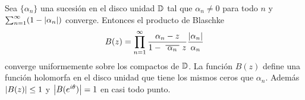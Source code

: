 
\begin{theorem}
    Sea $\{\alpha_n\}$ una sucesión en el disco unidad $\mathbb{D}$ tal que $\alpha_n \not = 0$ para todo $n$ y $\sum_{n=1}^{\infty} (1 - \left\lvert\alpha_n\right\rvert)$ converge. Entonces el producto de Blaschke
    \begin{equation*}
        B(z) = \prod_{n=1}^{\infty} \frac{\alpha_n - z}{1 - \xbar{\alpha_n}z} \dfrac{\abs{\alpha_n}}{\alpha_n}
    \end{equation*}
    converge uniformemente sobre los compactos de $\mathbb{D}$. La función $B(z)$ define una función holomorfa en el disco unidad que tiene los mismos ceros que $\alpha_n$. Además $\left\lvert B(z)\right\rvert \leq 1$ y $\left\lvert B(e^{i \theta})\right\rvert = 1$ en casi todo punto.
\end{theorem}

